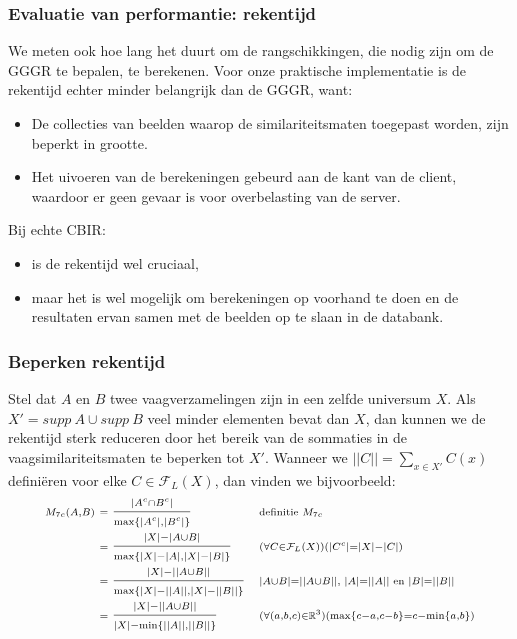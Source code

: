 \documentclass[dutch]{beamer}
\theoremstyle{definition}
\theoremstyle{remark}
\theoremstyle{example}
\begin{document}
\frame
{
  \frametitle{Evaluatie van performantie: rekentijd}
  
  We meten ook hoe lang het duurt om de rangschikkingen, die nodig zijn om 
  de GGGR te bepalen, te berekenen. Voor onze praktische implementatie
  is de rekentijd echter minder belangrijk dan de GGGR, want:
  \begin{itemize}
    \item De collecties van beelden waarop de similariteitsmaten toegepast worden,
    zijn beperkt in grootte.
    \item Het uivoeren van de berekeningen gebeurd aan de kant van de client, 
    waardoor er geen gevaar is voor overbelasting van de server.
  \end{itemize}
  Bij echte CBIR:
  \begin{itemize}
    \item is de rekentijd wel cruciaal,
    \item maar het is wel mogelijk om berekeningen op voorhand te doen en de resultaten
    ervan samen met de beelden op te slaan in de databank.
  \end{itemize}
}
\frame
{
  \frametitle{Beperken rekentijd}
  
  Stel dat $A$ en $B$ twee vaagverzamelingen zijn in een zelfde universum $X$. 
  Als $X'= supp\ A \cup supp\ B$ veel minder elementen bevat dan $X$, dan kunnen we 
  de rekentijd sterk reduceren door het bereik van de sommaties in de 
  vaagsimilariteitsmaten te beperken tot $X'$. Wanneer we $||C|| = \sum_{x \in X'} C(x)$
  defini\"eren voor elke $C \in \mathcal{F}_L(X)$, dan vinden we bijvoorbeeld:
  \begin{align*}
  \scriptstyle M_{7c}(A,B) 
  & \scriptstyle\ = \displaystyle \frac{\scriptstyle |A^c \cap B^c|}{\scriptstyle \max \{|A^c|,|B^c|\}} & & {\scriptsize \scriptstyle \text{definitie } M_{7c}} \\
  & \scriptstyle\ = \displaystyle \frac{\scriptstyle |X|-|A \cup B|}{\scriptstyle \max \{|X|-|A|,|X|-|B|\}} & & {\scriptsize \scriptstyle (\forall C \in \mathcal{F}_L(X))(|C^c|=|X|-|C|)} \\ 
  & \scriptstyle\ = \displaystyle \frac{\scriptstyle |X|-||A \cup B||}{\scriptstyle \max \{|X|-||A||,|X|-||B||\}} & & {\scriptsize \scriptstyle |A \cup B|=||A \cup B|| \text{, } |A|=||A|| \text{ en } |B|=||B||} \\
  & \scriptstyle\ = \displaystyle \frac{\scriptstyle |X|-||A \cup B||}{\scriptstyle |X| - \min \{||A||,||B||\}} & & {\scriptsize \scriptstyle (\forall (a,b,c) \in \mathbb{R}^3)(\max\{c-a,c-b\}=c-\min\{a,b\})}
  \end{align*}
}
\end{document}
